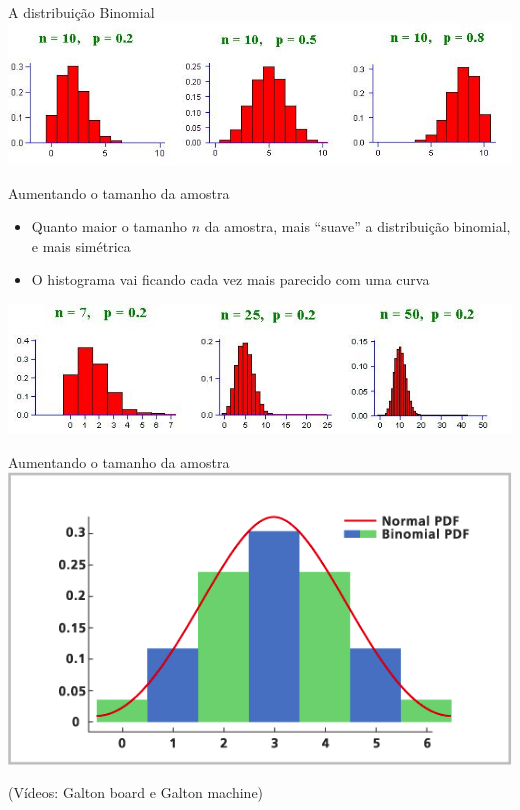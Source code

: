 \documentclass{beamer}
\begin{document}
\begin{frame}{A distribuição Binomial}
\includegraphics[width=\textwidth]{Prob_II/binomial}
\end{frame}

\begin{frame}{Aumentando o tamanho da amostra}
  \begin{itemize}
  \item Quanto maior o tamanho $n$ da amostra, mais ``suave'' a
    distribuição binomial, e mais simétrica
  \item O histograma vai ficando cada vez mais parecido com uma curva
  \end{itemize}
  \includegraphics[width=\textwidth]{Prob_II/binomial2}

\end{frame}

\begin{frame}{Aumentando o tamanho da amostra}
  \includegraphics[width=\textwidth]{Prob_II/aproximacao}

  (Vídeos: Galton board e Galton machine)
\end{frame}
\end{document}
